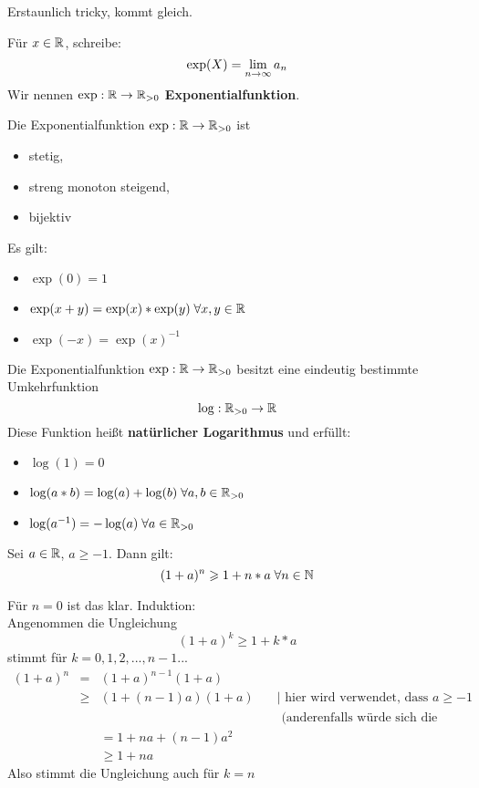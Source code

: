 \documentclass[main.tex]{subfiles}
\begin{document}
\begin{Beweis}
  Erstaunlich tricky, kommt gleich.
\end{Beweis}

\begin{Definition}[Exponentialfunktion]
  Für $x\in \mathbb{R}$, schreibe:
  $$\exp(X) = \lim \limits_{n \to \infty} a_n$$
  Wir nennen $\exp: \mathbb{R} \to \mathbb{R}_{>0}$ \textbf{Exponentialfunktion}.
\end{Definition}

\begin{Theorem}
  Die Exponentialfunktion $\exp : \mathbb{R} \to \mathbb{R}_{>0}$ ist
  \begin{itemize}
    \item stetig,
    \item streng monoton steigend,
    \item bijektiv
  \end{itemize}
  Es gilt:
  \begin{itemize}
    \item $\exp(0)=1$
    \item $\exp(x+y) = \exp(x) * \exp(y) \;\forall x,y \in \mathbb{R}$
    \item $\exp(-x) = \exp(x)^{-1}$
  \end{itemize}
\end{Theorem}

\begin{Theorem}[Logarithmus]
  Die Exponentialfunktion $\exp: \mathbb{R} \to \mathbb{R}_{> 0}$ besitzt eine eindeutig bestimmte Umkehrfunktion
  $$\log : \mathbb{R}_{> 0} \to \mathbb{R}$$
  Diese Funktion heißt \textbf{natürlicher Logarithmus} und erfüllt:
  \begin{itemize}
    \item $\log(1)=0$
    \item $\log(a*b) = \log(a)+\log(b) \;\forall a,b \in \mathbb{R}_{>0}$
    \item $\log(a^{-1}) = -\log(a) \;\forall a \in \mathbb{R}_{>0}$
  \end{itemize}
\end{Theorem}

\begin{Lemma}
  Sei $a\in \mathbb{R}$, $a \geq -1$. Dann gilt:
  $$(1+a)^n \geqslant 1 + n*a \;\forall n\in \mathbb{N}$$
\end{Lemma}

\begin{Beweis}
  Für $n=0$ ist das klar. Induktion:\\
  Angenommen die Ungleichung
  $$(1+a)^k \geq 1 + k*a$$
  stimmt für $k = 0,1,2,...,n-1$...
  $$\begin{aligned}
    (1+a)^n &=& (1+a)^{n-1}(1+a)&\\
    &\geq& (1+(n-1)a)(1+a) \quad & \mid \text{ hier wird verwendet, dass } a \geq -1\\
    &&&\text{ (anderenfalls würde sich die Gleichung umdrehen)}\\
    &&= 1 + na +(n-1)a^2 &\\
    &&\geq 1 +na &
  \end{aligned}$$
  Also stimmt die Ungleichung auch für $k = n$
\end{Beweis}
\end{document}
